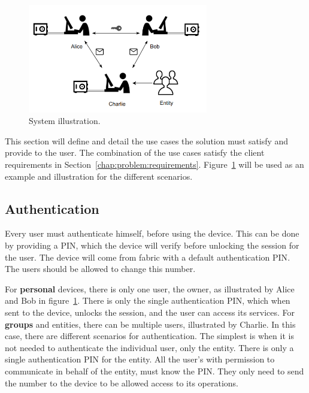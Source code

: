 \begin{figure}[h]
    \centering
    \includegraphics[width=0.7\textwidth]{./Images/main-figure.png}
    \caption{System illustration.}
    \label{fig:main-system}
\end{figure}

This section will define and detail the use cases the solution must satisfy and provide to the user. The combination of the use cases satisfy the client requirements in Section~\ref{chap:problem:requirements}.
Figure~\ref{fig:main-system} will be used as an example and illustration for the different scenarios.

\subsection{Authentication}\label{chap:problem:scenarios:auth}

Every user must authenticate himself, before using the device. This can be done by providing a \ac{PIN}, which the device will verify before unlocking the session for the user.
The device will come from fabric with a default authentication \ac{PIN}. The users should be allowed to change this number.

For \textbf{personal} devices, there is only one user, the owner, as illustrated by Alice and Bob in figure~\ref{fig:main-system}. There is only the single authentication \ac{PIN}, which when sent to the device, unlocks the session, and the user can access its services.
For \textbf{groups} and entities, there can be multiple users, illustrated by Charlie. In this case, there are different scenarios for authentication.
The simplest is when it is not needed to authenticate the individual user, only the entity. There is only a single authentication \ac{PIN} for the entity. All the user's with permission to communicate in behalf of the entity, must know the \ac{PIN}. They only need to send the number to the device to be allowed access to its operations.

